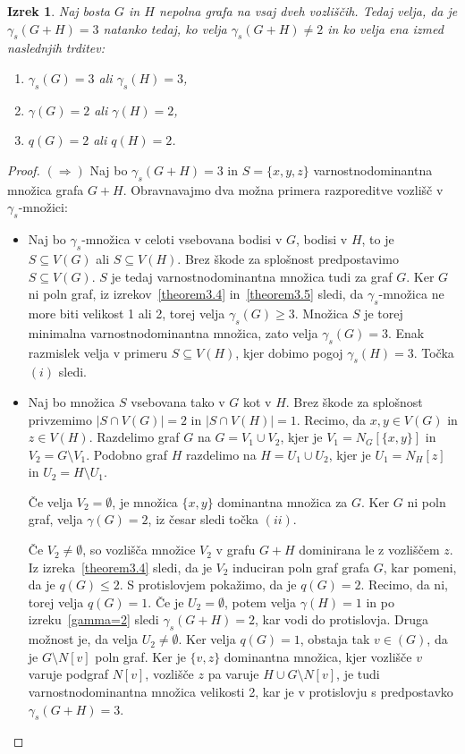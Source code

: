 \documentclass[12pt,a4paper,twoside]{article}
\theoremstyle{definition} %
\theoremstyle{plain} %
\newtheorem{izrek}[definicija]{Izrek}
\numberwithin{equation}{section}  %
\begin{document}
\begin{izrek} \label{gamma=3}
Naj bosta $G$ in $H$ nepolna grafa na vsaj dveh vozliščih. Tedaj velja, da je $\gamma_s(G + H) = 3$ natanko tedaj, ko velja $\gamma_s(G + H) \neq 2$ in ko velja ena izmed naslednjih trditev:
\begin{enumerate}[label=(\roman*)]
\item $\gamma_s(G) = 3$ ali $\gamma_s(H) = 3$,
\item $\gamma(G) = 2$ ali $\gamma(H) = 2$,
\item $q(G) = 2$ ali $q(H) = 2$.
\end{enumerate}
\end{izrek}
\begin{proof}
$(\Rightarrow)$ Naj bo $\gamma_s(G + H) = 3$ in $S = \{x,y,z\}$ varnostnodominantna množica grafa $G + H$. Obravnavajmo dva možna primera razporeditve vozlišč v $\gamma_s$-množici:
\begin{itemize}
\item Naj bo $\gamma_s$-množica v celoti vsebovana bodisi v $G$, bodisi v $H$, to je $S \subseteq V(G)$ ali $S \subseteq V(H)$. Brez škode za splošnost predpostavimo $S \subseteq V(G)$. $S$ je tedaj varnostnodominantna množica tudi za graf $G$. Ker $G$ ni poln graf, iz izrekov~\ref{theorem3.4} in~\ref{theorem3.5} sledi, da $\gamma_s$-množica ne more biti velikost 1 ali 2, torej velja $\gamma_s(G) \geq 3$. Množica $S$ je torej minimalna varnostnodominantna množica, zato velja $\gamma_s(G)=3$. Enak razmislek velja v primeru $S \subseteq V(H)$, kjer dobimo pogoj $\gamma_s(H)=3$. Točka $(i)$ sledi.
\item Naj bo množica $S$ vsebovana tako v $G$ kot v $H$. Brez škode za splošnost privzemimo $|S \cap V(G)| = 2$ in $|S \cap V(H)| = 1$. Recimo, da $x, y \in V(G)$ in $z \in V(H)$. Razdelimo graf $G$ na $G = V_1 \cup V_2$, kjer je $V_1 = N_G[\{x,y\}]$ in $V_2 = G \setminus V_1$. Podobno graf $H$ razdelimo na $H = U_1 \cup U_2$, kjer je $U_1 = N_H[z]$ in $U_2 = H \setminus U_1$.

Če velja $V_2 = \emptyset$, je množica $\{x,y\}$ dominantna množica za $G$. Ker $G$ ni poln graf, velja $\gamma(G)=2$, iz česar sledi točka $(ii)$.

Če $V_2 \neq \emptyset$, so vozlišča množice $V_2$ v grafu $G + H$ dominirana le z vozliščem $z$. Iz izreka~\ref{theorem3.4} sledi, da je $V_2$ induciran poln graf grafa $G$, kar pomeni, da je $q(G) \leq 2$. S protislovjem pokažimo, da je $q(G)=2$. Recimo, da ni, torej velja $q(G) = 1$. Če je $U_2=\emptyset$, potem velja $\gamma(H)=1$ in po izreku~\ref{gamma=2} sledi $\gamma_s(G+H)=2$, kar vodi do protislovja. Druga možnost je, da velja $U_2 \neq \emptyset$. Ker velja $q(G) = 1$, obstaja tak $v \in (G)$, da je $G \setminus N[v]$ poln graf. Ker je $\{v, z\}$ dominantna množica, kjer vozlišče $v$ varuje podgraf $N[v]$, vozlišče $z$ pa varuje $H \cup G \setminus N[v]$, je tudi varnostnodominantna množica velikosti 2, kar je v protislovju s predpostavko $\gamma_s(G + H) = 3$.


\end{itemize}
\end{proof}
\end{document}

